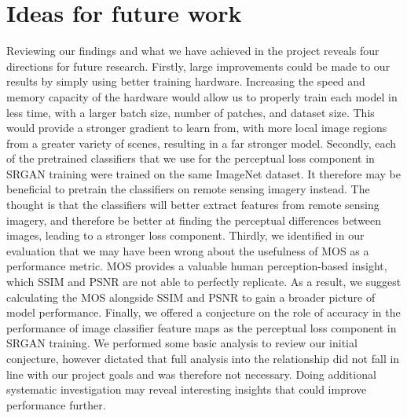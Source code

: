 \section{Ideas for future work}
Reviewing our findings and what we have achieved in the project reveals four directions for future research. Firstly, large improvements could be made to our results by simply using better training hardware. Increasing the speed and memory capacity of the hardware would allow us to properly train each model in less time, with a larger batch size, number of patches, and dataset size. This would provide a stronger gradient to learn from, with more local image regions from a greater variety of scenes, resulting in a far stronger model. Secondly, each of the pretrained classifiers that we use for the perceptual loss component in SRGAN training were trained on the same ImageNet dataset. It therefore may be beneficial to pretrain the classifiers on remote sensing imagery instead. The thought is that the classifiers will better extract features from remote sensing imagery, and therefore be better at finding the perceptual differences between images, leading to a stronger loss component. Thirdly, we identified in our evaluation that we may have been wrong about the usefulness of MOS as a performance metric. MOS provides a valuable human perception-based insight, which SSIM and PSNR are not able to perfectly replicate. As a result, we suggest calculating the MOS alongside SSIM and PSNR to gain a broader picture of model performance. Finally, we offered a conjecture on the role of accuracy in the performance of image classifier feature maps as the perceptual loss component in SRGAN training. We performed some basic analysis to review our initial conjecture, however dictated that full analysis into the relationship did not fall in line with our project goals and was therefore not necessary. Doing additional systematic investigation may reveal interesting insights that could improve performance further.